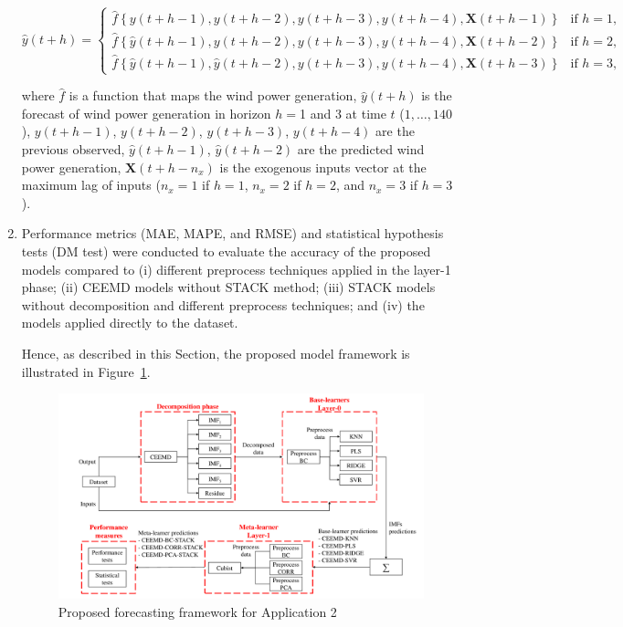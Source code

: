 \begin{enumerate}[start=1,label={\textbf{Step \arabic*:}},wide = 0pt, leftmargin = 3em]
\begin{scriptsize}
\begin{equation}
\hat{y}(t+h) = \begin{cases}
\hat{f}\left\{y(t+h-1),y(t+h-2),y(t+h-3),y(t+h-4),\mathbf{X}(t+h-1)\right\} & \text{if } h = 1, \\
\hat{f}\left\{\hat{y}(t+h-1),y(t+h-2),y(t+h-3),y(t+h-4),\mathbf{X}(t+h-2)\right\} & \text{if } h = 2, \\
\hat{f}\left\{\hat{y}(t+h-1),\hat{y}(t+h-2),y(t+h-3),y(t+h-4),\mathbf{X}(t+h-3)\right\} & \text{if } h = 3,
\end{cases}
\end{equation}
\end{scriptsize}
where $\hat{f}$ is a function that maps the wind power generation, $\hat{y}(t+h)$ is the forecast of wind power generation in horizon $h=$1 and 3 at time $t$ ($1,\ldots, 140$), $y(t+h-1)$, ${y}(t+h-2)$, ${y}(t+h-3)$, ${y}(t+h-4)$ are the previous observed, $\hat{y}(t+h-1)$, $\hat{y}(t+h-2)$ are the predicted wind power generation, $\mathbf{X}(t+h-n_x)$ is the exogenous inputs vector at the maximum lag of inputs ($n_x = 1$ if $h = 1$, {$n_x = 2$ if $h = 2$}, and $n_x = 3$ if $h = 3$).

\item Performance metrics (\ac{MAE}, \ac{MAPE}, and \ac{RMSE}) and statistical hypothesis tests (\ac{DM} test) were conducted to evaluate the accuracy of the proposed models compared to (i) different preprocess techniques applied in the layer-1 phase; (ii) \ac{CEEMD} models without \ac{STACK} method; (iii) \ac{STACK} models without decomposition and different preprocess techniques; and (iv) the models applied directly to the dataset. 

Hence, as described in this Section, the proposed model framework is illustrated in Figure~\ref{fig:frameworkcs1}.

\begin{figure}[htb!]
    \centering
    \includegraphics[width=\textwidth]{Media/cs2_framework.pdf}
    \caption{Proposed forecasting framework for Application 2 \label{fig:frameworkcs1}}
\end{figure}

\end{enumerate}